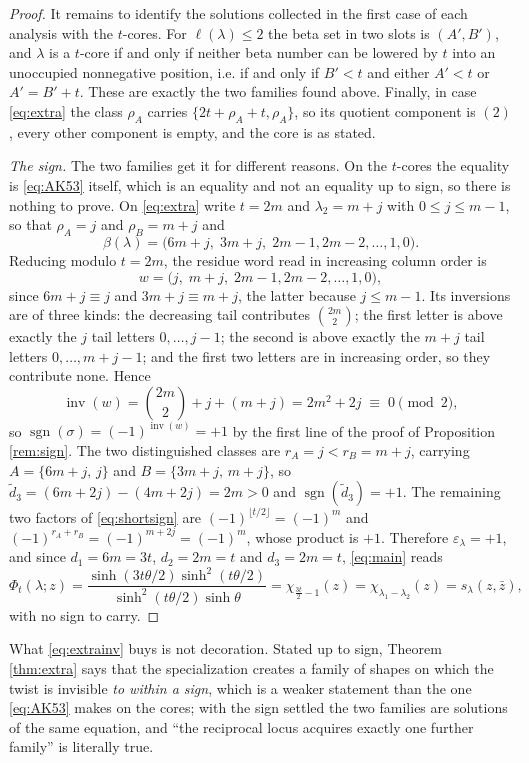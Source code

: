 \documentclass[11pt,reqno]{amsart}
\theoremstyle{plain}
\theoremstyle{definition}
\newcommand{\inv}{\operatorname{inv}}
\newcommand{\sgn}{\operatorname{sgn}}
\newcommand{\zb}{\bar z}
\begin{document}
\begin{proof}
It remains to identify the solutions collected in the first case of each analysis with the
$t$-cores. For $\ell(\lambda)\le2$ the beta set in two slots is $(A',B')$, and $\lambda$ is a
$t$-core if and only if neither beta number can be lowered by $t$ into an unoccupied nonnegative
position, i.e. if and only if $B'<t$ and either $A'<t$ or $A'=B'+t$. These are exactly the two
families found above. Finally, in case \eqref{eq:extra} the class $\rho_A$ carries
$\{2t+\rho_A+t,\rho_A\}$, so its quotient component is $(2)$, every other component is empty, and
the core is as stated.

\emph{The sign.} The two families get it for different reasons. On the $t$-cores the equality is
\eqref{eq:AK53} itself, which is an equality and not an equality up to sign, so there is nothing to
prove. On \eqref{eq:extra} write $t=2m$ and $\lambda_2=m+j$ with $0\le j\le m-1$, so that
$\rho_A=j$ and $\rho_B=m+j$ and
\[
\beta(\lambda)=\bigl(6m+j,\;3m+j,\;2m-1,2m-2,\dots,1,0\bigr).
\]
Reducing modulo $t=2m$, the residue word read in increasing column order is
\[
w=\bigl(j,\;m+j,\;2m-1,2m-2,\dots,1,0\bigr),
\]
since $6m+j\equiv j$ and $3m+j\equiv m+j$, the latter because $j\le m-1$. Its inversions are of
three kinds: the decreasing tail contributes $\binom{2m}{2}$; the first letter is above exactly the
$j$ tail letters $0,\dots,j-1$; the second is above exactly the $m+j$ tail letters $0,\dots,m+j-1$;
and the first two letters are in increasing order, so they contribute none. Hence
\begin{equation}\label{eq:extrainv}
\inv(w)=\binom{2m}{2}+j+(m+j)=2m^{2}+2j\;\equiv\;0\pmod2 ,
\end{equation}
so $\sgn(\sigma)=(-1)^{\inv(w)}=+1$ by the first line of the proof of Proposition \ref{rem:sign}.
The two distinguished classes are $r_A=j<r_B=m+j$, carrying $A=\{6m+j,\,j\}$ and
$B=\{3m+j,\,m+j\}$, so $\tilde d_3=(6m+2j)-(4m+2j)=2m>0$ and $\sgn(\tilde d_3)=+1$. The remaining
two factors of \eqref{eq:shortsign} are $(-1)^{\lfloor t/2\rfloor}=(-1)^{m}$ and
$(-1)^{r_A+r_B}=(-1)^{m+2j}=(-1)^{m}$, whose product is $+1$. Therefore
$\varepsilon_\lambda=+1$, and since $d_1=6m=3t$, $d_2=2m=t$ and $d_3=2m=t$, \eqref{eq:main} reads
\[
\Phi_t(\lambda;z)=\frac{\sinh(3t\theta/2)\sinh^{2}(t\theta/2)}{\sinh^{2}(t\theta/2)\sinh\theta}
=\chi_{\frac{3t}{2}-1}(z)=\chi_{\lambda_1-\lambda_2}(z)=s_\lambda(z,\zb),
\]
with no sign to carry.
\end{proof}

\noindent What \eqref{eq:extrainv} buys is not decoration. Stated up to sign, Theorem
\ref{thm:extra} says that the specialization creates a family of shapes on which the twist is
invisible \emph{to within a sign}, which is a weaker statement than the one \eqref{eq:AK53} makes on
the cores; with the sign settled the two families are solutions of the same equation, and
``the reciprocal locus acquires exactly one further family'' is literally true.
\end{document}
